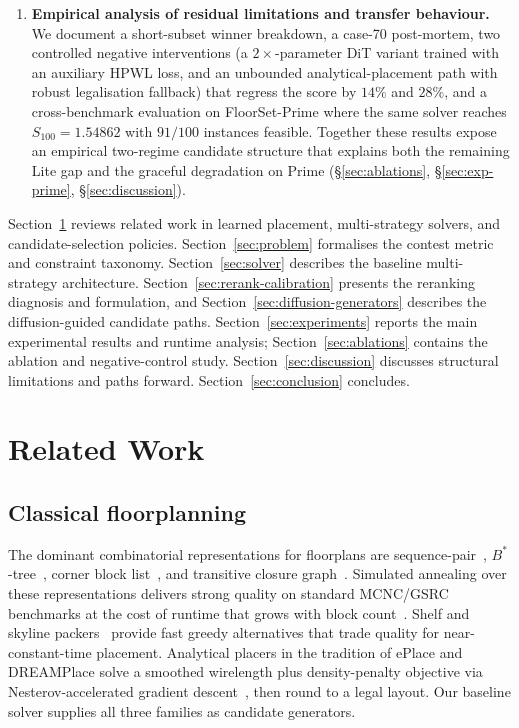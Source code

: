 \documentclass[nolineno]{ieeeaccess}
\begin{document}
\begin{enumerate}
    \item \textbf{Empirical analysis of residual limitations and
    transfer behaviour.} We document a short-subset winner breakdown,
    a case-70 post-mortem, two controlled negative interventions (a
    $2\times$-parameter DiT variant trained with an auxiliary HPWL loss,
    and an unbounded analytical-placement path with robust legalisation
    fallback) that regress the score by $14\%$ and $28\%$, and a
    cross-benchmark evaluation on FloorSet-Prime where the same solver
    reaches $S_{100}=1.54862$ with $91/100$ instances feasible. Together
    these results expose an empirical two-regime candidate structure
    that explains both the remaining Lite gap and the graceful
    degradation on Prime (\S\ref{sec:ablations},
    \S\ref{sec:exp-prime}, \S\ref{sec:discussion}).
\end{enumerate}

Section~\ref{sec:related} reviews related work in learned placement,
multi-strategy solvers, and candidate-selection policies.
Section~\ref{sec:problem} formalises the contest metric and constraint
taxonomy. Section~\ref{sec:solver} describes the baseline multi-strategy
architecture. Section~\ref{sec:rerank-calibration} presents the
reranking diagnosis and formulation, and
Section~\ref{sec:diffusion-generators} describes the diffusion-guided
candidate paths. Section~\ref{sec:experiments} reports the main
experimental results and runtime analysis; Section~\ref{sec:ablations}
contains the ablation and negative-control study.
Section~\ref{sec:discussion} discusses structural limitations and
paths forward. Section~\ref{sec:conclusion} concludes.

\section{Related Work}
\label{sec:related}

\subsection{Classical floorplanning}
The dominant combinatorial representations for floorplans are
sequence-pair~\cite{murata1996sequence}, $B^{*}$-tree~\cite{chang2000btree},
corner block list~\cite{hong2000corner}, and transitive closure
graph~\cite{lin2002tcg}. Simulated annealing over these representations
delivers strong quality on standard MCNC/GSRC benchmarks at the cost of
runtime that grows with block count~\cite{parquet2008}. Shelf and
skyline packers~\cite{hopper2001two} provide fast greedy alternatives
that trade quality for near-constant-time placement. Analytical
placers in the tradition of ePlace and DREAMPlace solve a smoothed
wirelength plus density-penalty objective via Nesterov-accelerated
gradient descent~\cite{lu2015eplace,lin2019dreamplace}, then round to a
legal layout. Our baseline solver supplies all three families as
candidate generators.
\end{document}

